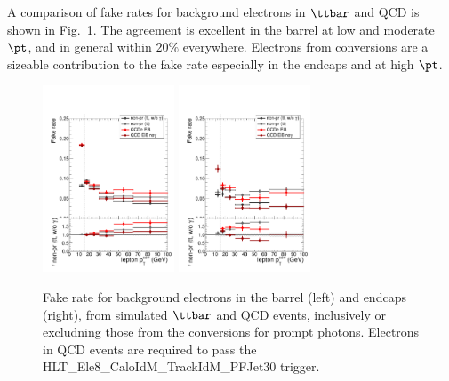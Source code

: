 A comparison of fake rates for background electrons in $\ttbar$ and QCD is shown in Fig.~\ref{fig:frmeas-closure-bnb-el}. The agreement is excellent in the barrel at low and moderate $\pt$, and in general within $20\%$ everywhere. Electrons from conversions are a sizeable contribution to the fake rate especially in the endcaps and at high $\pt$.
\begin{figure}[htb]
	\centering 
\includegraphics[width=0.35\textwidth]{plots_fakerate/measurement/el_lbin_barrel}
\includegraphics[width=0.35\textwidth]{plots_fakerate/measurement/el_lbin_endcap}
	\caption{Fake rate for background electrons in the barrel (left) and endcaps (right), from simulated $\ttbar$ and QCD events, inclusively or excludning those from the conversions for prompt photons. Electrons in QCD events are required to pass the HLT\_Ele8\_CaloIdM\_TrackIdM\_PFJet30 trigger.}
	\label{fig:frmeas-closure-bnb-el}
\end{figure}


